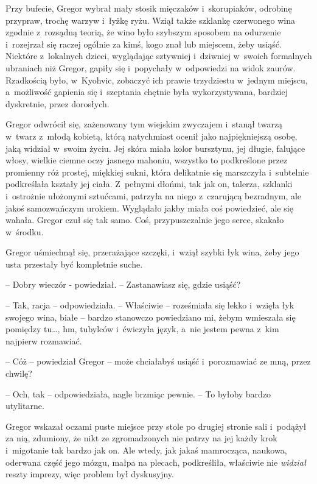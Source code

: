 \documentclass[oneside,polish,12pt,sfheadings]{mwbk}
\begin{document}
Przy bufecie, Gregor wybrał mały stosik mięczaków i~skorupiaków,
odrobinę przypraw, trochę warzyw i~łyżkę ryżu. Wziął także szklankę
czerwonego wina zgodnie z~rozsądną teorią, że wino było szybszym
sposobem na odurzenie i~rozejrzał się raczej ogólnie za kimś, kogo znał
lub miejscem, żeby usiąść. Niektóre z~lokalnych dzieci, wyglądając
sztywniej i~dziwniej w~swoich formalnych ubraniach niż Gregor, gapiły
się i~popychały w~odpowiedzi na widok zaurów. Rzadkością było, w~Kyohvic, zobaczyć ich prawie trzydziestu w~jednym miejscu, a~możliwość
gapienia się i~szeptania chętnie była wykorzystywana, bardziej
dyskretnie, przez dorosłych.

Gregor odwrócił się, zażenowany tym wiejskim zwyczajem i~stanął twarzą w~twarz z~młodą kobietą, którą natychmiast ocenił jako najpiękniejszą
osobę, jaką widział w~swoim życiu. Jej skóra miała kolor bursztynu, jej
długie, falujące włosy, wielkie ciemne oczy jasnego mahoniu, wszystko to
podkreślone przez promienny róż prostej, miękkiej sukni, która
delikatnie się marszczyła i~subtelnie podkreślała kształy jej ciała. Z~pełnymi dłońmi, tak jak on, talerza, szklanki i~ostrożnie ułożonymi
sztućcami, patrzyła na niego z~czarującą bezradnym, ale jakoś
samozwańczym urokiem. Wyglądało jakby miała coś powiedzieć, ale się
wahała. Gregor czuł się tak samo. Coś, przypuszczalnie jego serce,
skakało w~środku.

Gregor uśmiechnął się, przerażające szczęki, i~wziął szybki łyk wina,
żeby jego usta przestały być kompletnie suche. 

-- Dobry wieczór -
powiedział. -- Zastanawiasz się, gdzie usiąść?

-- Tak, racja -- odpowiedziała. -- Właściwie -- roześmiała się lekko i~wzięła łyk swojego wina, białe -- bardzo stanowczo powiedziano mi, żebym
wmieszała się pomiędzy tu\ldots, hm, tubylców i~ćwiczyła język, a~nie jestem
pewna z~kim najpierw rozmawiać.

-- Cóż -- powiedział Gregor -- może chciałabyś usiąść i~porozmawiać ze mną,
przez chwilę?

-- Och, tak -- odpowiedziała, nagle brzmiąc pewnie. -- To byłoby bardzo
utylitarne.

Gregor wskazał oczami puste miejsce przy stole po drugiej stronie sali i~podążył za nią, zdumiony, że nikt ze zgromadzonych nie patrzy na jej
każdy krok i~migotanie tak bardzo jak on. Ale wtedy, jak jakaś
mamrocząca, naukowa, oderwana część jego mózgu, małpa na plecach,
podkreśliła, właściwie nie \emph{widział} reszty imprezy, więc problem
był dyskusyjny.
\end{document}
